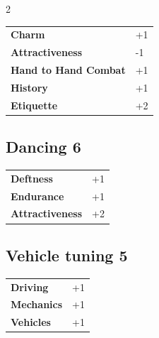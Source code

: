 \begin{multicols}{2}
\begin{tcolorbox}
\begin{tabular}{@{}ll@{}}
    \textbf{Charm} & +1\\
    \textbf{Attractiveness} & -1\\
    \textbf{Hand to Hand Combat} & +1\\
    \textbf{History} & +1\\
    \textbf{Etiquette} & +2\\
\end{tabular}


\end{tcolorbox}

\begin{tcolorbox}
    \subsection*{Dancing \hfill \small{6 }}
    \tcblower




\begin{tabular}{@{}ll@{}}
    \textbf{Deftness} & +1\\
    \textbf{Endurance} & +1\\
    \textbf{Attractiveness} & +2\\
\end{tabular}


\end{tcolorbox}

\begin{tcolorbox}
    \subsection*{Vehicle tuning \hfill \small{5 }}
    \tcblower




\begin{tabular}{@{}ll@{}}
    \textbf{Driving} & +1\\
    \textbf{Mechanics} & +1\\
    \textbf{Vehicles} & +1\\
\end{tabular}


\end{tcolorbox}
\end{multicols}
